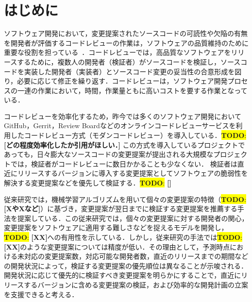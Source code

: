 \documentclass[submit,ses,noauthor]{ipsj}
\newcommand{\todo}[1]{\colorbox{yellow}{{\bf TODO}:}{\color{red} {\textbf{[#1]}}}}
\begin{document}
\maketitle

\section{はじめに}

ソフトウェア開発において，変更提案されたソースコードの可読性や欠陥の有無を開発者が評価するコードレビューの作業は，ソフトウェアの品質維持のために重要な役割を担っている~\cite{quality1}\cite{quality2}．コードレビューでは，高品質なソフトウェアをリリースするために，複数人の開発者（検証者）がソースコードを検証し，ソースコードを実装した開発者（実装者）とソースコード変更の妥当性の合意形成を図り，必要に応じて修正を繰り返す．コードレビューは，ソフトウェア開発プロセスの一連の作業において，時間，作業量ともに高いコストを要する作業となっている\cite{}．

コードレビューを効率化するため，昨今では多くのソフトウェア開発においてGitHub，Gerrit，Review Boardなどのオンラインコードレビューサービスを利用したコードレビュー方式（モダンコードレビュー\cite{}）を導入している．\todo{どの程度効率化したか引用がほしい．}
この方式を導入しているプロジェクトであっても，日々膨大なソースコードの変更提案が提出される大規模なプロジェクトでは，検証者がコードレビューに数日かかることも少なくない\cite{}．
検証者は直近にリリースするバージョンに導入する変更提案としてソフトウェアの脆弱性を解決する変更提案などを優先して検証する．\todo{}

従来研究では，機械学習アルゴリズムを用いて個々の変更提案の特徴（\todo{XやXなど}）に基づき，変更提案が翌日までに検証する変更提案を推薦する手法を提案している\cite{prioritizer}．この従来研究では，個々の変更提案に対する開発者の関心，変更提案をソフトウェアに適用する難しさなどを捉えるモデルを開発し，\todo{XX}への有用性を示している．しかし，従来研究の手法では\todo{XX}のような変更提案については精度が低い．その理由として，予測時点における未対応の変更提案数，対応可能な開発者数，直近のリリースまでの期間などの開発状況によって，検証する変更提案の優先順位は異なることが示唆される．\cite{}
開発状況に応じて優先的に検証すべき変更提案を明らかにすることで，直近にリリースするバージョンに含める変更提案の検証，および効率的な開発計画の立案を支援できると考える．
\end{document}
